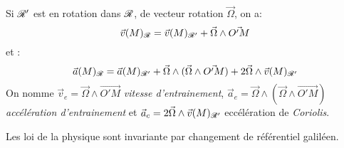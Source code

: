 \begin{lemme} Si $\mathscr{R}'$ est en rotation dans $\mathscr{R}$, de vecteur rotation $\vec{\Omega}$, on a:
    \[ \vec{v}(M)_{\mathscr{R}} = \vec{v}(M)_{\mathscr{R}'} + \vec{\Omega}\wedge\vec{O'M} \]
    et :
    \[ \vec{a}(M)_{\mathscr{R}} = \vec{a}(M)_{\mathscr{R}'} + \vec{\Omega}\wedge(\vec{\Omega}\wedge\vec{O'M}) + 2\vec{\Omega}\wedge\vec{v}(M)_{\mathscr{R}'} \]
    On nomme $\vec{v}_e = \vec{\Omega}\wedge\vec{O'M}$ \emph{vitesse d'entrainement}, $\vec{a}_e = \vec{\Omega}\wedge(\vec{\Omega}\wedge\vec{O'M})$ \emph{accélération d'entrainement} et $\vec{a}_c = 2\vec{\Omega}\wedge\vec{v}(M)_{\mathscr{R}'}$ eccélération de \emph{Coriolis}.
\end{lemme}

\begin{theo} Les loi de la physique sont invariante par changement de référentiel galiléen.
\end{theo}


